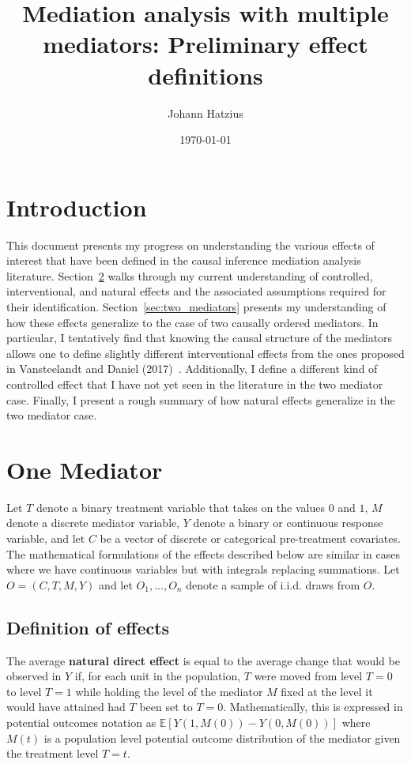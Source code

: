 \documentclass[12pt]{article} %
\title{Mediation analysis with multiple mediators: Preliminary effect definitions}
\author{Johann Hatzius}
\date{\today}
\numberwithin{equation}{section} %
\begin{document}
\maketitle

\section{Introduction}

This document presents my progress on understanding the various effects of interest that have been defined in the causal inference mediation analysis literature. Section~\ref{sec:one_mediator} walks through my current understanding of controlled, interventional, and natural effects and the associated assumptions required for their identification. Section~\ref{sec:two_mediators} presents my understanding of how these effects generalize to the case of two causally ordered mediators. In particular, I tentatively find that knowing the causal structure of the mediators allows one to define slightly different interventional effects from the ones proposed in Vansteelandt and Daniel (2017)~\cite{vansteelandtdaniel2017}. Additionally, I define a different kind of controlled effect that I have not yet seen in the literature in the two mediator case. Finally, I present a rough summary of how natural effects generalize in the two mediator case. 

\section{One Mediator}
\label{sec:one_mediator}

Let $T$ denote a binary treatment variable that takes on the values $0$ and $1$, $M$ denote a discrete mediator variable, $Y$ denote a binary or continuous response variable, and let $C$ be a vector of discrete or categorical pre-treatment covariates. The mathematical formulations of the effects described below are similar in cases where we have continuous variables but with integrals replacing summations. Let $O = (C, T, M, Y)$ and let $O_{1},...,O_{n}$ denote a sample of i.i.d. draws from $O$. 

\subsection{Definition of effects}

The average \textbf{natural direct effect} is equal to the average change that would be observed in $Y$ if, for each unit in the population, $T$ were moved from level $T = 0$ to level $T = 1$ while holding the level of the mediator $M$ fixed at the level it would have attained had $T$ been set to $T = 0$. Mathematically, this is expressed in potential outcomes notation as $\mathbb{E}[Y(1,M(0)) - Y(0,M(0))]$ where $M(t)$ is a population level potential outcome distribution of the mediator given the treatment level $T = t$. 
\end{document}
